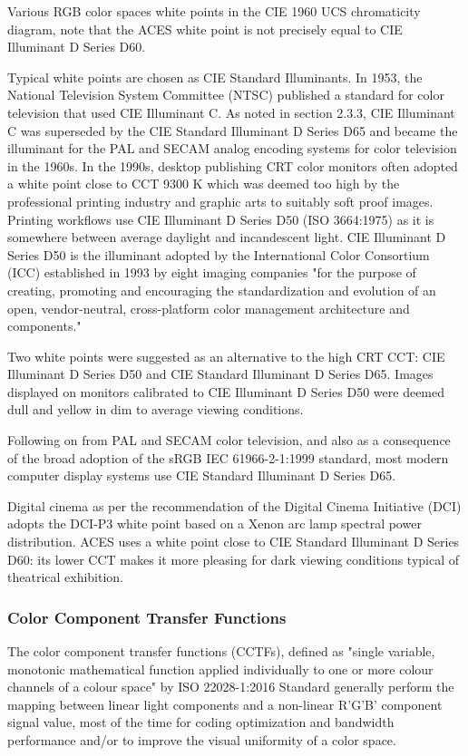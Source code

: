 Various RGB color spaces white points in the CIE 1960 UCS chromaticity diagram, note that the ACES white point is not precisely equal to CIE Illuminant D Series D60.

Typical white points are chosen as CIE Standard Illuminants. In 1953, the National Television System Committee (NTSC) published a standard for color television that used CIE Illuminant C. As noted in section 2.3.3, CIE Illuminant C was superseded by the CIE Standard Illuminant D Series D65 and became the illuminant for the PAL and SECAM analog encoding systems for color television in the 1960s.
In the 1990s, desktop publishing CRT color monitors often adopted a white point close to CCT 9300 K which was deemed too high by the professional printing industry and graphic arts to suitably soft proof images. Printing workflows use CIE Illuminant D Series D50 (ISO 3664:1975) as it is somewhere between average daylight and incandescent light. CIE Illuminant D Series D50 is the illuminant adopted by the International Color Consortium (ICC) established in 1993 by eight imaging companies "for the purpose of creating, promoting and encouraging the standardization and evolution of an open, vendor-neutral, cross-platform color management architecture and components."

Two white points were suggested as an alternative to the high CRT CCT: CIE Illuminant D Series D50 and CIE Standard Illuminant D Series D65. Images displayed on monitors calibrated to CIE Illuminant D Series D50 were deemed dull and yellow in dim to average viewing conditions.

Following on from PAL and SECAM color television, and also as a consequence of the broad adoption of the sRGB IEC 61966-2-1:1999 standard, most modern computer display systems use CIE Standard Illuminant D Series D65.

Digital cinema as per the recommendation of the Digital Cinema Initiative (DCI) adopts the DCI-P3 white point based on a Xenon arc lamp spectral power distribution. ACES uses a white point close to CIE Standard Illuminant D Series D60: its lower CCT makes it more pleasing for dark viewing conditions typical of theatrical exhibition.

\subsubsection{Color Component Transfer Functions}
The color component transfer functions (CCTFs), defined as "single variable, monotonic mathematical function applied individually to one or more colour channels of a colour space" by  ISO 22028-1:2016 Standard generally perform the mapping between linear light components and a non-linear R'G'B' component signal value, most of the time for coding optimization and bandwidth performance and/or to improve the visual uniformity of a color space.

